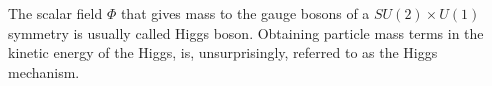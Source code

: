 The scalar field $\Phi$ that gives mass to the gauge bosons of a $SU(2)\times U(1)$ symmetry is usually called Higgs boson. Obtaining particle mass terms in the kinetic energy of the Higgs, is, unsurprisingly, referred to as the Higgs mechanism. 
%
%
